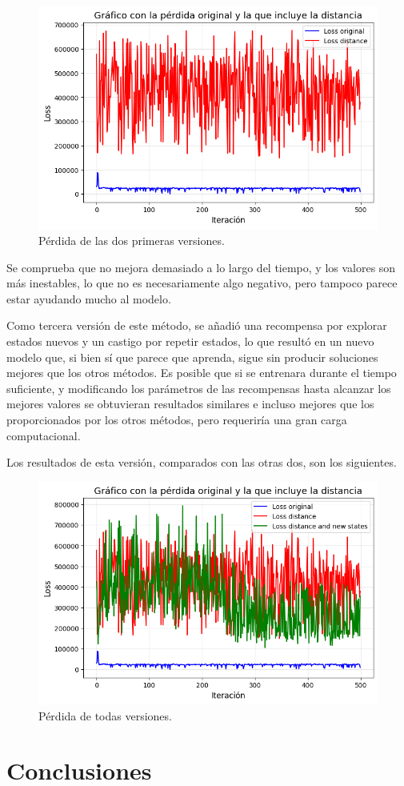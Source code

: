 \documentclass[letterpaper]{article} %
\begin{document}
\begin{figure}[H]
    \centering
    \includegraphics[width=0.9\columnwidth]{FuN_2.png}
    \caption{Pérdida de las dos primeras versiones.}
    \label{fig:FuN2}
\end{figure}

Se comprueba que no mejora demasiado a lo largo del tiempo, y los valores son más inestables, lo que no es necesariamente algo negativo, pero tampoco parece estar ayudando mucho al modelo.

Como tercera versión de este método, se añadió una recompensa por explorar estados nuevos y un castigo por repetir estados, lo que resultó en un nuevo modelo que, si bien sí que parece que aprenda, sigue sin producir soluciones mejores que los otros métodos. Es posible que si se entrenara durante el 
tiempo suficiente, y modificando los parámetros de las recompensas hasta alcanzar los mejores valores se obtuvieran resultados similares e incluso mejores que los proporcionados por los otros métodos, pero requeriría una gran carga computacional.

Los resultados de esta versión, comparados con las otras dos, son los siguientes.
\begin{figure}[H]
    \centering
    \includegraphics[width=0.9\columnwidth]{FuN_3.png}
    \caption{Pérdida de todas versiones.}
    \label{fig:FuN3}
\end{figure}


\section{Conclusiones}






\end{document}
